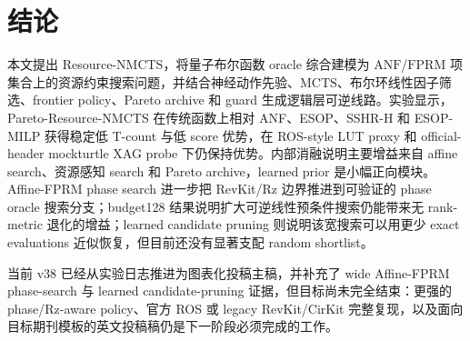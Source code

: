 \documentclass[UTF8,fontset=macnew,11pt]{ctexart}
\newcommand{\method}{Resource-NMCTS}
\newcommand{\anf}{\ensuremath{\mathrm{ANF}}}
\newcommand{\fprm}{\ensuremath{\mathrm{FPRM}}}
\newcommand{\mcts}{\ensuremath{\mathrm{MCTS}}}
\begin{document}
\section{结论}

本文提出 \method{}，将量子布尔函数 oracle 综合建模为 \anf{}/\fprm{} 项集合上的资源约束搜索问题，并结合神经动作先验、\mcts{}、布尔环线性因子筛选、frontier policy、Pareto archive 和 guard 生成逻辑层可逆线路。实验显示，Pareto-\method{} 在传统函数上相对 ANF、ESOP、SSHR-H 和 ESOP-MILP 获得稳定低 T-count 与低 score 优势，在 ROS-style LUT proxy 和 official-header mockturtle XAG probe 下仍保持优势。内部消融说明主要增益来自 affine search、资源感知 search 和 Pareto archive，learned prior 是小幅正向模块。Affine-FPRM phase search 进一步把 RevKit/Rz 边界推进到可验证的 phase oracle 搜索分支；budget128 结果说明扩大可逆线性预条件搜索仍能带来无 rank-metric 退化的增益；learned candidate pruning 则说明该宽搜索可以用更少 exact evaluations 近似恢复，但目前还没有显著支配 random shortlist。

当前 v38 已经从实验日志推进为图表化投稿主稿，并补充了 wide Affine-FPRM phase-search 与 learned candidate-pruning 证据，但目标尚未完全结束：更强的 phase/Rz-aware policy、官方 ROS 或 legacy RevKit/CirKit 完整复现，以及面向目标期刊模板的英文投稿稿仍是下一阶段必须完成的工作。
\end{document}
